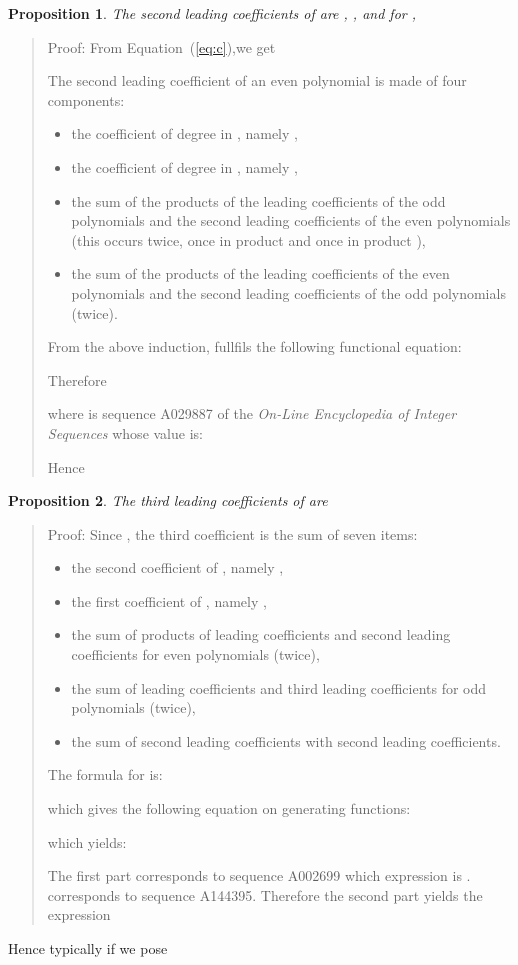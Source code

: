 \documentclass[preprint,authoryear]{elsarticle}
\newenvironment{proof}[1]{\begin{quotation}\noindent\textsf{Proof:} #1}{\end{quotation}}
\newtheorem{prop}{Proposition}
\begin{document}
\begin{prop}
  The second leading coefficients of  are , ,  and for  ,
 
\end{prop}
\begin{proof}{}
From Equation~(\ref{eq:c}),we get

The second leading coefficient of an even polynomial  is made of four components:
\begin{itemize}
\item the coefficient of degree  in , namely ,
\item the coefficient of degree  in , namely ,
\item the sum of the products of the leading coefficients of the odd polynomials and the
  second leading coefficients of the even polynomials (this occurs twice, once in product
   and once in product ),
\item the sum of the products of the leading coefficients of the even polynomials and the
  second leading coefficients of the odd polynomials (twice).
\end{itemize}

From the above induction,  fullfils the following functional equation:

Therefore

where  is sequence \textsf{A029887} of  the \emph{On-Line Encyclopedia of
  Integer Sequences} whose value is:

  Hence 

\end{proof}
\begin{prop}
  The third leading coefficients of  are 
  
\end{prop}
 \begin{proof}{}
    Since , the third coefficient is the sum of seven
  items:
  \begin{itemize}
  \item the second coefficient of , namely ,
  \item the first coefficient of , namely ,
  \item the sum of products of leading coefficients and second leading coefficients for
    even polynomials (twice),
  \item the sum of leading coefficients and third leading coefficients for odd polynomials
    (twice),
  \item the sum of second leading coefficients with second leading coefficients.
  \end{itemize}
The formula for  is:

which gives the following equation on generating functions:

which yields:

The first part corresponds to sequence \textsf{A002699} which expression is
.  corresponds to sequence \textsf{A144395}. Therefore
the second part yields the expression 
  \end{proof}
Hence typically if we pose
\end{document}
